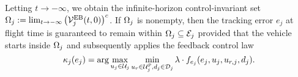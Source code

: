 Letting $t \to -\infty$, we obtain the infinite-horizon control-invariant set $\Omega_j := \lim_{t \to -\infty} \left( \mathcal{V}^{\text{EB}}_{j}(t, 0) \right)^c$. If $\Omega_j$ is nonempty, then the tracking error $e_j$ at flight time is guaranteed to remain within $\Omega_j \subseteq \mathcal{E}_j$ provided that the vehicle starts inside $\Omega_j$ and subsequently applies the feedback control law
\vspace{-0.1cm}
\begin{equation}
\label{eq:robust_tracking_law}
\tracklaw_j(e_j) = \arg\max_{\ctrl_j \in \cset_j} \min_{\ctrl_r \in\cset^\pos_j, \dstb_j \in \dset_j} \costate \cdot \fdyn_{e_j}(e_j,\ctrl_j,\ctrl_{r, j},\dstb_j).
\end{equation}

%
%
